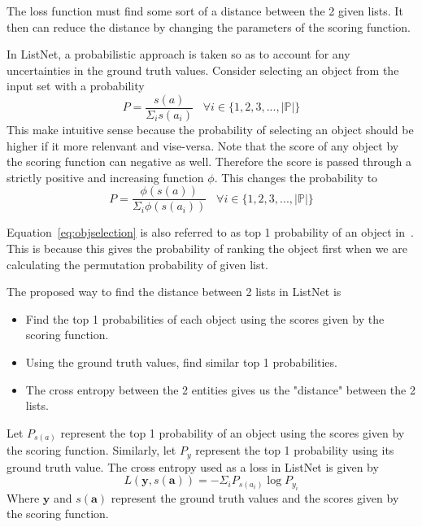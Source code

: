 \documentclass[11pt]{report}
\begin{document}
The loss function must find some sort of a distance between the 2 given lists.
It then can reduce the distance by changing the parameters of the scoring function.

In ListNet,  a probabilistic approach is taken so as to account for any uncertainties in the ground truth values.
Consider selecting an object from the input set with a probability
$$
P = \frac{s(a)}{\Sigma_i s(a_i)} \;\;\; \forall i \in \{1, 2, 3, ...,  |\mathbb{P}|\}
$$
This make intuitive sense because the probability of selecting an object should be higher if it more relenvant and vise-versa.
Note that the score of any object by the scoring function can negative as well.
Therefore the score is passed through a strictly positive and increasing function $\phi$.
This changes the probability to
\begin{equation}\label{eq:objselection}
P = \frac{\phi(s(a))}{\Sigma_i \phi(s(a_i))} \;\;\; \forall i \in \{1, 2, 3, ...,  |\mathbb{P}|\}
\end{equation}

Equation~\ref{eq:objselection} is also referred to as top 1 probability of an object in~\cite{listwisebetter}.
This is because this gives the probability of ranking the object first when we are calculating the permutation probability of given list.

The proposed way to find the distance between 2 lists in ListNet is
\begin{itemize}
\item Find the top 1 probabilities of each object using the scores given by the scoring function.
\item Using the ground truth values,  find similar top 1 probabilities.
\item The cross entropy between the 2 entities gives us the "distance" between the 2 lists.
\end{itemize}

Let $P_{s(a)}$ represent the top 1 probability of an object using the scores given by the scoring function.
Similarly,   let $P_y$ represent the top 1 probability using its ground truth value.
The cross entropy used as a loss in ListNet is given by
\begin{equation}
L(\textbf{y},  {s(\textbf{a})}) = - \Sigma_i P_{s(a_i)} \log P_{y_i}
\end{equation}
Where $\textbf{y}$ and $s(\textbf{a})$ represent the ground truth values and the scores given by the scoring function.

\end{document}
